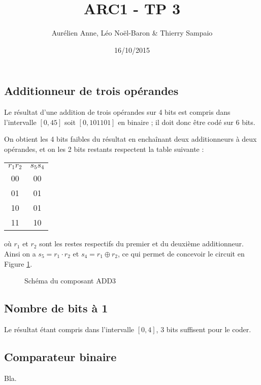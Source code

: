 \documentclass[a4paper,11pt]{article}
\title{ARC1 - TP 3}
\author{Aurélien Anne, Léo Noël-Baron \& Thierry Sampaio}
\date{16/10/2015}
\begin{document}
\maketitle

\subsection*{Additionneur de trois opérandes}

Le résultat d'une addition de trois opérandes sur 4 bits est compris dans l'intervalle $[0, 45]$ soit $[0, 101101]$ en binaire ; il doit donc être codé sur 6 bits.

On obtient les 4 bits faibles du résultat en enchaînant deux additionneurs à deux opérandes, et on les 2 bits restants respectent la table suivante :
\begin{center}\begin{tabular}{c|c}
$r_1r_2$ & $s_5s_4$ \\
00 & 00 \\
01 & 01 \\
10 & 01 \\
11 & 10 \\
\end{tabular}\end{center}
où $r_1$ et $r_2$ sont les restes respectifs du premier et du deuxième additionneur. Ainsi on a $s_5=r_1\cdot r_2$ et $s_4=r_1\oplus r_2$, ce qui permet de concevoir le circuit en Figure \ref{add3}.

\begin{figure}[h]
\center
\caption{Schéma du composant ADD3}
\label{add3}
\end{figure}


\subsection*{Nombre de bits à 1}

Le résultat étant compris dans l'intervalle $[0, 4]$, 3 bits suffisent pour le coder.


\subsection*{Comparateur binaire}

Bla.
\end{document}
